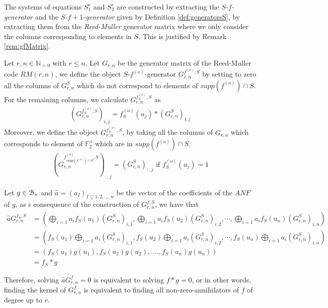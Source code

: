 \documentclass[11pt]{llncs}
\begin{document}
The systems of equations $S_1^r$ and $S_2^r$ are constructed by extracting the \textit{$S$-$f$-generator} and the \textit{$S$-$f+1$-generator} given by Definition \ref{def:generatorsS}, by extracting them from the \textit{Reed-Muller} generator matrix where we only consider the columns corresponding to elements in $S$. This is justified by Remark \ref{rem:gfMatrix}.

\begin{definition}\label{def:generatorsS}
	Let $r,n\in\mathbb{N}_{>0}$ with $r\leq n$. Let $G_{r,n}$ be the generator matrix of the Reed-Muller code $RM(r,n)$, we define the object $S$-$f^{(o)}$-generator $G_{r,n}^{f^{(o)},S}$ by setting to zero all the columns of $G_{r,n}^S$ which do not correspond to elements of $supp(f^{(o)} )\cap S$. For the remaining columns, we calculate $G_{r,n}^{f_S^{(o)},S}$ as
	\begin{align*}
	\left(G_{r,n}^{f^{(o)}_S,S}\right)_{i,j} = f_S^{(o)}(u_j)*\left(G_{r,n}^S\right)_{i,j}
	\end{align*}
	Moreover, we define the object $G_{r,n}^{f^{(o)}_S,S}$, by taking all the columns of $G_{r,n}$ which corresponds to element of $\mathbb{F}_2^n$ which are in $supp\left(f^{(o)}\right) \cap S$.
	\begin{align}
	\left(G_{r,n}^{f_{supp\left(f^{(o)}\right) \cap S}^{(o)},S}\right)_{:,j} = (G_{r,n}^S)_{:,j} \mbox{ if } f_S^{(o)}(u_j) = 1 \label{eq:f-generatorRestrictedSet}
	\end{align}
\end{definition}

\begin{remark}\label{rem:gfMatrix}
	Let $g \in \mathcal{B}_{n}$ and $\hat{a} = (a_I)_{I \subseteq {1,2,...,n}}$ be the vector of the coefficients of the $ANF$ of $g$, as s consequence of the construction of $G_{r,n}^{f,S}$, we have that
	\begin{equation}
	\begin{aligned}
	\hat{a} G_{r,n}^{f_S,S} & = \left(\bigoplus_{i=1}a_i f_S(u_1)(G_{r,n}^S)_{i,1}, \bigoplus_{i=1}a_i f_S(u_2)(G_{r,n}^S)_{i,2}, \cdots, \bigoplus_{i=1}a_i f_S(u_n)(G_{r,n}^S)_{i,n}\right)     \\
	& =  \left(f_S(u_1) \bigoplus_{i=1}a_i (G_{r,n}^S)_{i,1}, f_S(u_2) \bigoplus_{i=1}a_i (G_{r,n}^S)_{i,2}, \cdots, f_S(u_n) \bigoplus_{i=1}a_i (G_{r,n}^S)_{i,n}\right) \\
	& = \left(f_S(u_1) g(u_1), f_S(u_2) g(u_2), ...., f_S(u_n) g(u_n)\right)                                                                                      \\
	& = f_S*g
	\end{aligned}
	\end{equation}
	
	Therefore, solving $ \hat{a} G_{r,n}^f = 0$ is equivalent to solving $f*g = 0$, or in other words, finding the kernel of $G_{r,n}^f$ is equivalent to finding all non-zero-annihilators of $f$ of degree up to $r$.
\end{remark}
\end{document}
